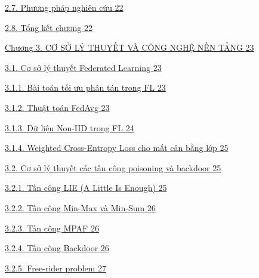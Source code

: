 \hyperref[phux1b0ux1a1ng-phuxe1p-nghiuxean-cux1ee9u]{2.7. Phương pháp nghiên cứu \hyperref[phux1b0ux1a1ng-phuxe1p-nghiuxean-cux1ee9u]{22}}

\hyperref[tux1ed5ng-kux1ebft-chux1b0ux1a1ng]{2.8. Tổng kết chương \hyperref[tux1ed5ng-kux1ebft-chux1b0ux1a1ng]{22}}

\hyperref[chux1b0ux1a1ng-3.-cux1a1-sux1edf-luxfd-thuyux1ebft-vuxe0-cuxf4ng-nghux1ec7-nux1ec1n-tux1ea3ng]{Chương 3. CƠ SỞ LÝ THUYẾT VÀ CÔNG NGHỆ NỀN TẢNG \hyperref[chux1b0ux1a1ng-3.-cux1a1-sux1edf-luxfd-thuyux1ebft-vuxe0-cuxf4ng-nghux1ec7-nux1ec1n-tux1ea3ng]{23}}

\hyperref[cux1a1-sux1edf-luxfd-thuyux1ebft-federated-learning]{3.1. Cơ sở lý thuyết Federated Learning \hyperref[cux1a1-sux1edf-luxfd-thuyux1ebft-federated-learning]{23}}

\hyperref[buxe0i-touxe1n-tux1ed1i-ux1b0u-phuxe2n-tuxe1n-trong-fl]{3.1.1. Bài toán tối ưu phân tán trong FL \hyperref[buxe0i-touxe1n-tux1ed1i-ux1b0u-phuxe2n-tuxe1n-trong-fl]{23}}

\hyperref[thuux1eadt-touxe1n-fedavg]{3.1.2. Thuật toán FedAvg \hyperref[thuux1eadt-touxe1n-fedavg]{23}}

\hyperref[dux1eef-liux1ec7u-non-iid-trong-fl]{3.1.3. Dữ liệu Non-IID trong FL \hyperref[dux1eef-liux1ec7u-non-iid-trong-fl]{24}}

\hyperref[weighted-cross-entropy-loss-cho-mux1ea5t-cuxe2n-bux1eb1ng-lux1edbp]{3.1.4. Weighted Cross-Entropy Loss cho mất cân bằng lớp \hyperref[weighted-cross-entropy-loss-cho-mux1ea5t-cuxe2n-bux1eb1ng-lux1edbp]{25}}

\hyperref[cux1a1-sux1edf-luxfd-thuyux1ebft-cuxe1c-tux1ea5n-cuxf4ng-poisoning-vuxe0-backdoor]{3.2. Cơ sở lý thuyết các tấn công poisoning và backdoor \hyperref[cux1a1-sux1edf-luxfd-thuyux1ebft-cuxe1c-tux1ea5n-cuxf4ng-poisoning-vuxe0-backdoor]{25}}

\hyperref[tux1ea5n-cuxf4ng-lie-a-little-is-enough]{3.2.1. Tấn công LIE (A Little Is Enough) \hyperref[tux1ea5n-cuxf4ng-lie-a-little-is-enough]{25}}

\hyperref[tux1ea5n-cuxf4ng-min-max-vuxe0-min-sum]{3.2.2. Tấn công Min-Max và Min-Sum \hyperref[tux1ea5n-cuxf4ng-min-max-vuxe0-min-sum]{26}}

\hyperref[tux1ea5n-cuxf4ng-mpaf]{3.2.3. Tấn công MPAF \hyperref[tux1ea5n-cuxf4ng-mpaf]{26}}

\hyperref[tux1ea5n-cuxf4ng-backdoor]{3.2.4. Tấn công Backdoor \hyperref[tux1ea5n-cuxf4ng-backdoor]{26}}

\hyperref[free-rider-problem]{3.2.5. Free-rider problem \hyperref[free-rider-problem]{27}}


